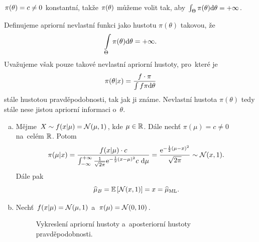 $\pi(\theta)=c\neq0$ konstantní, takže $\pi(\theta)$ můžeme volit tak, aby $\int_\Theta\pi(\theta)\mathrm{d}\theta=+\infty$.
\begin{define} Definujeme apriorní nevlastní funkci jako hustotu $\pi(\theta)$ takovou, že $$ \int\limits_{\Theta}{\pi(\theta)\mathrm{d}\theta} = +\infty.$$  Uvažujeme však pouze takové nevlastní apriorní hustoty, pro~které je 
	$$\pi(\theta|x)=\frac{f\cdot \pi}{\int f\pi\mathrm{d}\theta}$$ stále hustotou pravděpodobnosti, tak jak ji známe. Nevlastní hustota $\pi(\theta)$ tedy stále nese jistou apriorní informaci o~$\theta$.
\end{define}
\begin{example}\begin{enumerate}[a)]
		\item 
	Mějme $X\sim f(x|\mu)=\mathcal{N}(\mu,1)$, kde $\mu\in\mathbb{R}$. Dále nechť $\pi(\mu)=c\neq0$ na~celém $\mathbb{R}$. Potom$$ \pi(\mu|x)=\frac{f(x|\mu)\cdot c}{\int_{-\infty}^{+\infty}\frac{1}{\sqrt{2\pi}}\mathrm{e}^{-\frac{1}{2}(x-\mu)^2}c~\mathrm{d}\mu}=\frac{\mathrm{e}^{-\frac{1}{2}(\mu-x)^2}}{\sqrt{2\pi}}\sim\mathcal{N}(x,1).$$
	Dále pak 
	$$\widehat{\mu}_B=\mathbb{E}\left[ \mathcal{N}(x,1) \right]=x=\widehat{\mu}_{\mathrm{ML}}.$$
	\item Nechť $f(x|\mu)=\mathcal{N}(\mu,1)$ a~$\pi(\mu)=\mathcal{N}(0,10)$.
	
\begin{figure}[h]
	\centering
	\caption{Vykreslení apriorní hustoty a~aposteriorní hustoty pravděpodobnosti.}
\end{figure}
	


\end{enumerate}
\end{example}
